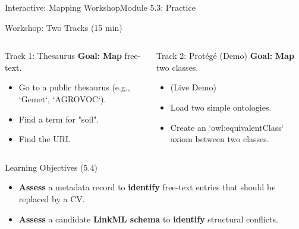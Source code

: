 \begin{frame}{Interactive: Mapping Workshop}{Module 5.3: Practice}
    \begin{block}{Workshop: Two Tracks (15 min)}
        \begin{columns}
            \begin{block}{Track 1: Thesaurus}
                \textbf{Goal:} \textbf{Map} free-text.
                \pause
                \begin{itemize}
                    \item Go to a public thesaurus (e.g., `Gemet`, `AGROVOC`).
                    \item Find a term for "soil".
                    \item Find the URI.
                \end{itemize}
            \end{block}
            
            \begin{block}{Track 2: Protégé (Demo)}
                \textbf{Goal:} \textbf{Map} two classes.
                \pause
                \begin{itemize}
                    \item (Live Demo)
                    \item Load two simple ontologies.
                    \item Create an `owl:equivalentClass` axiom between two classes.
                \end{itemize}
            \end{block}
        \end{columns}
    \end{block}
\end{frame}

\begin{frame}{Learning Objectives (5.4)}
    \begin{itemize}
        \item \textbf{Assess} a metadata record to \textbf{identify} free-text entries that should be replaced by a CV.
        \item \textbf{Assess} a candidate \textbf{LinkML schema} to \textbf{identify} structural conflicts.
    \end{itemize}
\end{frame}

